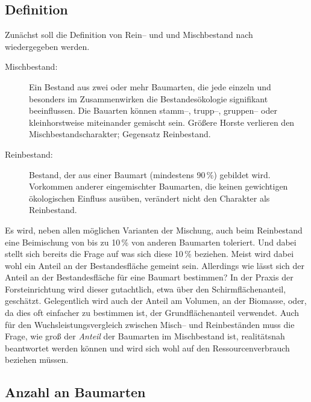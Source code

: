 \documentclass[twocolumn]{scrartcl}
\begin{document}
\subsection{Definition}
\label{ssec:definition}

Zunächst soll die Definition von Rein-- und und Mischbestand nach
\cite{bruenig1980WaldbaulicheTerminologi} wiedergegeben werden.
\begin{description}
\item[Mischbestand:] Ein Bestand aus
  zwei oder mehr Baumarten, die jede einzeln und besonders im
  Zusammenwirken die Bestandesökologie signifikant beeinflussen. Die
  Bauarten können stamm--, trupp--, gruppen-- oder kleinhorstweise
  miteinander gemischt sein. Größere Horste verlieren den
  Mischbestandscharakter; Gegensatz Reinbestand.
\item[Reinbestand:] Bestand, der aus
  einer Baumart (mindestens 90\,\%) gebildet wird. Vorkommen anderer
  eingemischter Baumarten, die keinen gewichtigen ökologischen
  Einfluss ausüben, verändert nicht den Charakter als Reinbestand.
\end{description}

Es wird, neben allen möglichen Varianten der Mischung, auch beim
Reinbestand eine Beimischung von bis zu 10\,\% von anderen Baumarten
toleriert. Und dabei stellt sich bereits die Frage auf was sich diese
10\,\% beziehen. Meist wird dabei wohl ein Anteil an der
Bestandesfläche gemeint sein. Allerdings wie lässt sich der Anteil an
der Bestandesfläche für eine Baumart bestimmen? In der Praxis der
Forsteinrichtung wird dieser gutachtlich, etwa über den
Schirmflächenanteil, geschätzt. Gelegentlich wird auch der Anteil am
Volumen, an der Biomasse, oder, da dies oft einfacher zu bestimmen
ist, der Grundflächenanteil verwendet. Auch für den
Wuchsleistungsvergleich zwischen Misch-- und Reinbeständen muss die
Frage, wie groß der \emph{Anteil} der Baumarten im Mischbestand ist,
realitätsnah beantwortet werden können und wird sich wohl auf den
Ressourcenverbrauch beziehen müssen.

\subsection{Anzahl an Baumarten}
\label{ssec:anzahlBaumarten}
\end{document}
